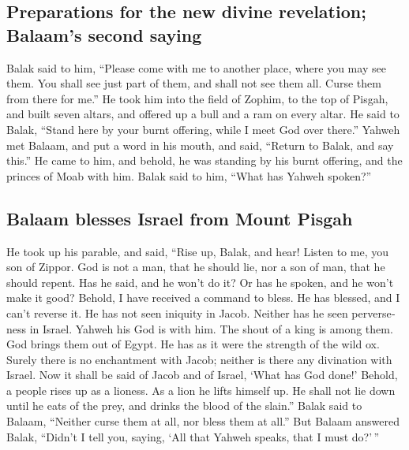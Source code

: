 \begin{paracol}{2}
\begin{otherlanguage}{english}
\hypertarget{preparations-for-the-new-divine-revelation-balaams-second-saying}{%
\subsection{Preparations for the new divine revelation; Balaam's second
saying}\label{preparations-for-the-new-divine-revelation-balaams-second-saying}}

 Balak said to him, ``Please come with me to another
place, where you may see them. You shall see just part of them, and
shall not see them all. Curse them from there for me.'' 
He took him into the field of Zophim, to the top of Pisgah, and built
seven altars, and offered up a bull and a ram on every altar.
 He said to Balak, ``Stand here by your burnt offering,
while I meet God over there.''  Yahweh met Balaam, and
put a word in his mouth, and said, ``Return to Balak, and say this.''
 He came to him, and behold, he was standing by his burnt
offering, and the princes of Moab with him. Balak said to him, ``What
has Yahweh spoken?''

\hypertarget{balaam-blesses-israel-from-mount-pisgah}{%
\subsection{Balaam blesses Israel from Mount
Pisgah}\label{balaam-blesses-israel-from-mount-pisgah}}

 He took up his parable, and said, ``Rise up, Balak, and
hear! Listen to me, you son of Zippor.  God is not a man,
that he should lie, nor a son of man, that he should repent. Has he
said, and he won't do it? Or has he spoken, and he won't make it good?
 Behold, I have received a command to bless. He has
blessed, and I can't reverse it.  He has not seen
iniquity in Jacob. Neither has he seen perverseness in Israel. Yahweh
his God is with him. The shout of a king is among them. 
God brings them out of Egypt. He has as it were the strength of the wild
ox.  Surely there is no enchantment with Jacob; neither
is there any divination with Israel. Now it shall be said of Jacob and
of Israel, `What has God done!'  Behold, a people rises
up as a lioness. As a lion he lifts himself up. He shall not lie down
until he eats of the prey, and drinks the blood of the slain.''
 Balak said to Balaam, ``Neither curse them at all, nor
bless them at all.''  But Balaam answered Balak, ``Didn't
I tell you, saying, `All that Yahweh speaks, that I must do?'\,''


\end{otherlanguage}
\end{paracol}
